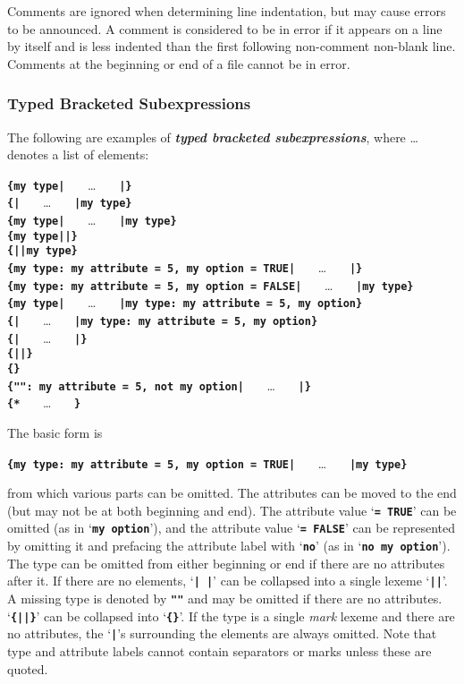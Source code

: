 \documentclass[12pt]{article}
\newcommand{\TT}[1]{{\tt \bfseries #1}}
\newcommand{\skey}[2]{{\bf \em #1#2}\index{#1}}
\begin{document}
Comments are ignored when determining line indentation, but may
cause errors to be announced.  A comment is considered to be in error
if it appears on a line by itself and is less indented than the first
following non-comment non-blank line.
Comments at the beginning or end of a file cannot be
in error.

\subsubsection{Typed Bracketed Subexpressions}
\label{TYPED-BRACKETED-SUBEXPRESSIONS}

The following are examples of
\skey{typed bracketed subexpression}s,
where \ldots{} denotes a list of elements:
\begin{center}
\TT{\{my type|} ~~~\ldots~~~ \TT{|\}} \\
\TT{\{|} ~~~\ldots~~~ \TT{|my type\}} \\
\TT{\{my type|} ~~~\ldots~~~ \TT{|my type\}} \\
\TT{\{my type||\}} \\
\TT{\{||my type\}} \\
\TT{\{my type: my attribute = 5, my option = TRUE|} ~~~\ldots~~~ \TT{|\}} \\
\TT{\{my type: my attribute = 5, my option = FALSE|} ~~~\ldots~~~
    \TT{|my type\}} \\
\TT{\{my type|} ~~~\ldots~~~
    \TT{|my type: my attribute = 5, my option\}} \\
\TT{\{|} ~~~\ldots~~~ \TT{|my type: my attribute = 5, my option\}} \\
\TT{\{|} ~~~\ldots~~~ \TT{|\}} \\
\TT{\{||\}} \\
\TT{\{\}} \\
\TT{\{"": my attribute = 5, not my option|} ~~~\ldots~~~ \TT{|\}} \\
\TT{\{*} ~~~\ldots~~~ \TT{*\}} \\
\end{center}

The basic form is
\begin{center}
\TT{\{my type: my attribute = 5, my option = TRUE|} ~~~\ldots~~~
    \TT{|my type\}} \\
\end{center}
from which various parts can be omitted.  The attributes can be moved to
the end (but may not be at both beginning and end).
The attribute value `\TT{= TRUE}' can be omitted (as in
`\TT{my option}'), and the attribute value `\TT{= FALSE}' can be represented
by omitting it and prefacing the attribute label with `\TT{no}'
(as in `\TT{no my option}').
The type can be omitted from either beginning or end if there are no attributes
after it.  If there are no elements, `\TT{|~|}' can be collapsed into
a single lexeme `\TT{||}'.  A missing type is denoted
by \TT{""} and may be omitted if there are no attributes.
`\TT{\{||\}}' can be collapsed into `\TT{\{\}}'.  If the type is
a single {\em mark} lexeme and there are no attributes,
the `\TT{|}'s surrounding
the elements are always omitted.  Note that type and attribute labels
cannot contain separators or marks unless these are quoted.
\end{document}
